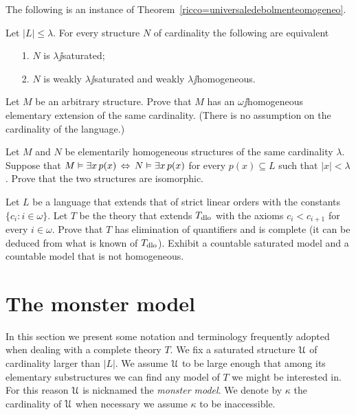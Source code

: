 \documentclass[creche.tex]{subfiles}
\begin{document}
The following is an instance of Theorem~\ref{ricco=universaledebolmenteomogeneo}.

\begin{corollary}\label{saturo=universaledebolmenteomogeneo}
Let $|L|\le\lambda$. For every structure $N$ of cardinality the following are equivalent\nobreak
\begin{itemize}
\item[1.] $N$ is $\lambda\jj$saturated;
\item[2.] $N$ is weakly $\lambda\jj$saturated and weakly $\lambda\jj$homogeneous.\QED
\end{itemize}
\end{corollary}


\begin{exercise}\label{ex_omega_homogeneous_same_card}
Let $M$ be an arbitrary structure. Prove that $M$ has an $\omega\jj$homogeneous elementary extension of the same cardinality. (There is no assumption on the cardinality of the language.)\QED 
\end{exercise}

\begin{exercise}
Let $M$ and $N$ be elementarily homogeneous structures of the same cardinality $\lambda$. Suppose that $M\vDash\exists x\, p(x)\,\Leftrightarrow\,N\vDash\exists x\, p(x)$ for every $p(x)\subseteq L$ such that $|x|<\lambda$. Prove that the two structures are isomorphic.\QED 
\end{exercise}

\begin{exercise}\label{vaughtesempio}
Let $L$ be a language that extends that of strict linear orders with the constants $\{c_i: i\in\omega\}$. Let $T$ be the theory that extends $T_{\rm dlo}$ with the axioms $c_i<c_{i+1}$ for every  $i\in\omega$. Prove that $T$ has elimination of quantifiers and is complete (it can be deduced from what is known of $T_{\rm dlo}$). Exhibit a countable saturated model and a countable model that is not homogeneous.\QED 
\end{exercise}

\section{The monster model}\label{monster}

\label{compattezzasaturazione}


In this section we present some notation and terminology frequently adopted when dealing with a complete theory $T$. We fix a saturated structure $\EuScript U$ of cardinality larger than $|L|$. We assume $\EuScript U$ to be large enough that among its elementary substructures we can find any model of $T$ we might be interested in. For this reason $\EuScript U$ is nicknamed the \emph{monster model}. We denote by $\kappa$ the cardinality of $\EuScript U$ when necessary we assume $\kappa$ to be inaccessible. 
\end{document}
